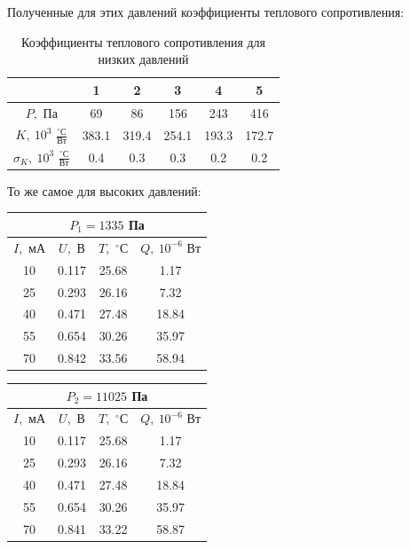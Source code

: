 \documentclass[a4paper,12pt]{article}
\theoremstyle{definition}
\begin{document}
\begin{enumerate}
	Полученные для этих давлений коэффициенты теплового сопротивления:
	\bgroup
	\def\arraystretch{1.2}%
	\begin{table}[H]
		\centering
		\begin{tabular}{|c|c|c|c|c|c|}
			\hline
			~ &1&2&3&4&5\\\hline
			$P,$ Па&69&86&156&243&416\\ \hline
			$K,\: 10^3$ $\frac{^\circ\text{С}}{\text{Вт}}$& 383.1&319.4&254.1&193.3&172.7\\\hline
			$\sigma_K,\: 10^3$ $\frac{^\circ\text{С}}{\text{Вт}}$ & 0.4& 0.3& 0.3& 0.2&0.2\\\hline
		\end{tabular}
		\caption{Коэффициенты теплового сопротивления для низких давлений}
		\label{tablow}
	\end{table}
	\egroup
	То же самое для высоких давлений:
	\begin{table}[H]
		\centering
		\begin{minipage}{.49\linewidth}
			\centering
			\begin{tabular}{|c|c|c|c|}
				\hline
				\multicolumn{4}{|c|}{$P_1 = 1335$ Па}\\
				\hline
				$I,$ мА & $U,$ В& $T,$ $^\circ$С & $Q,\: 10^{-6}$ Вт \\ \hline
				10 & 0.117 & 25.68 & 1.17 \\ \hline
				25 & 0.293 & 26.16 & 7.32 \\ \hline
				40 & 0.471 & 27.48 & 18.84 \\ \hline
				55 & 0.654 & 30.26 & 35.97 \\ \hline
				70 & 0.842 & 33.56 & 58.94 \\ \hline
			\end{tabular}
		\end{minipage}
		\begin{minipage}{.49\linewidth}
			\centering
			\begin{tabular}{|c|c|c|c|}
				\hline
				\multicolumn{4}{|c|}{$P_2 = 11025$ Па}\\
				\hline
				$I,$ мА & $U,$ В& $T,$ $^\circ$С & $Q,\: 10^{-6}$ Вт \\ \hline
				10 & 0.117 & 25.68 & 1.17 \\ \hline
				25 & 0.293 & 26.16 & 7.32 \\ \hline
				40 & 0.471 & 27.48 & 18.84 \\ \hline
				55 & 0.654 & 30.26 & 35.97 \\ \hline
				70 & 0.841 & 33.22 & 58.87 \\ \hline
			\end{tabular}
		\end{minipage}
		

\end{table}
\end{enumerate}
\end{document}
